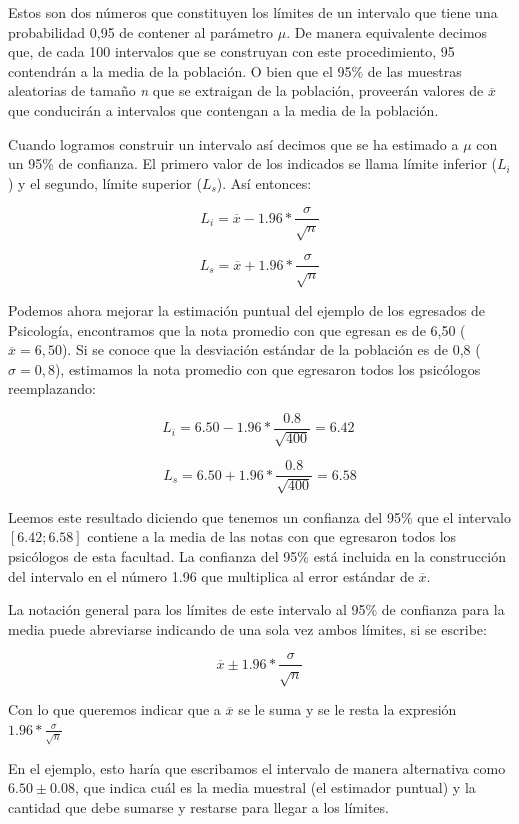 \documentclass[]{book}
\begin{document}
Estos son dos números que constituyen los límites de un intervalo que
tiene una probabilidad 0,95 de contener al parámetro \(\mu\). De manera
equivalente decimos que, de cada 100 intervalos que se construyan con
este procedimiento, 95 contendrán a la media de la población. O bien que
el 95\% de las muestras aleatorias de tamaño \emph{n} que se extraigan de la
población, proveerán valores de \(\overline{x}\) que conducirán a
intervalos que contengan a la media de la población.

Cuando logramos construir un intervalo así decimos que se ha estimado a
\(\mu\) con un 95\% de confianza. El primero valor de los indicados se
llama límite inferior (\(L_i\)) y el segundo, límite superior (\(L_s\)).
Así entonces:

\[L_{i} = \overline{x} - 1.96*\frac{\sigma}{\sqrt{n}}\]

\[L_{s} = \overline{x} + 1.96*\frac{\sigma}{\sqrt{n}}\]

Podemos ahora mejorar la estimación puntual del ejemplo de los egresados de Psicología, encontramos que la nota promedio con que egresan es de 6,50 (\(\overline{x} = 6,50\)). Si se conoce que la desviación estándar de la población es de 0,8 (\(\sigma = 0,8\)), estimamos la nota promedio con que egresaron todos los psicólogos reemplazando:

\[L_{i} = 6.50 - 1.96*\frac{0.8}{\sqrt{400}} = 6.42\ \]

\[L_{s} = 6.50 + 1.96*\frac{0.8}{\sqrt{400}} = 6.58\]

Leemos este resultado diciendo que tenemos un confianza del 95\% que el
intervalo \([6.42; 6.58]\) contiene a la media de las notas con que
egresaron todos los psicólogos de esta facultad. La confianza del 95\%
está incluida en la construcción del intervalo en el número 1.96 que
multiplica al error estándar de \(\overline{x}\).

La notación general para los límites de este intervalo al 95\% de confianza para la media puede abreviarse indicando de una sola vez ambos límites, si se escribe:

\[\overline{x} \pm 1.96*\frac{\sigma}{\sqrt{n}}\]

Con lo que queremos indicar que a \(\overline{x}\) se le suma y se le
resta la expresión \(1.96*\frac{\sigma}{\sqrt{n}}\)

En el ejemplo, esto haría que escribamos el intervalo de manera
alternativa como \(6.50 \pm 0.08\), que indica cuál es la media muestral
(el estimador puntual) y la cantidad que debe sumarse y restarse para
llegar a los límites.
\end{document}
